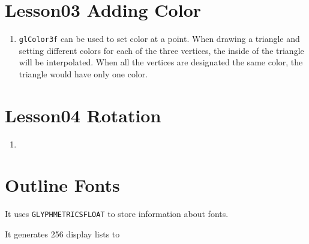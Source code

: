 \section{Lesson03 Adding Color}
\begin{enumerate}
	\item \verb|glColor3f| can be used to set color at a point. When drawing a triangle and setting different colors for each of the three vertices, the inside of the triangle will be interpolated. When all the vertices are designated the same color, the triangle would have only one color.
\end{enumerate}

\section{Lesson04 Rotation}
\begin{enumerate}
	\item 
\end{enumerate}

\section{Outline Fonts}

It uses \verb|GLYPHMETRICSFLOAT| to store information about fonts.

It generates 256 display lists to 


